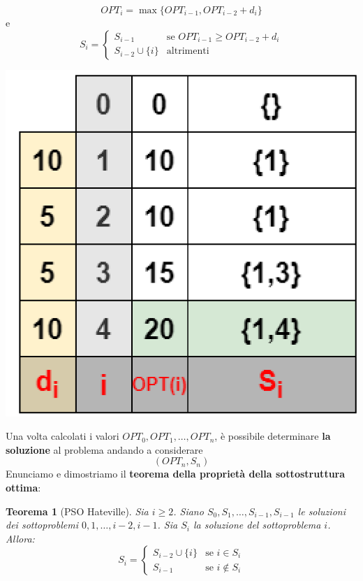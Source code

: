\documentclass[12pt]{article}
\newtheorem{Teorema}{Teorema}[subsection]
\begin{document}
$$OPT_i = \max\{OPT_{i-1}, OPT_{i-2} + d_i\}$$
e
\begin{equation*}
    S_i = \begin{cases}
        S_{i-1} & \textrm{se } OPT_{i-1} \geq OPT_{i-2} + d_i \\
        S_{i-2} \cup \{i\} & \textrm{altrimenti}
    \end{cases}
\end{equation*}
\begin{center}
    \includegraphics[width = 0.40\linewidth]{Images/11.png}
\end{center}
Una volta calcolati i valori $OPT_0, OPT_1 ,\dots, OPT_n$, è possibile determinare \textbf{la soluzione} al problema andando a considerare
$$(OPT_n, S_n)$$
Enunciamo e dimostriamo il \textbf{teorema della proprietà della sottostruttura ottima}:
\begin{Teorema}[PSO Hateville]
    Sia $i \geq 2$. Siano $S_0, S_1, \dots, S_{i-1}, S_{i-1}$ le soluzioni dei sottoproblemi $0, 1, \dots, i-2, i-1$.
    Sia $S_i$ la soluzione del sottoproblema $i$. Allora:
    \begin{equation*}
        S_i = \begin{cases}
            S_{i-2} \cup \{i\} & \textrm{se } i \in S_i \\
            S_{i-1} & \textrm{se } i \notin S_i
        \end{cases}
    \end{equation*}
\end{Teorema}
\end{document}
